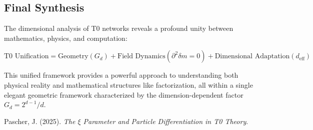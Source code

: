 \documentclass[12pt,a4paper]{article}
\newcommand{\deltafield}{\ensuremath{\delta m}}
\begin{document}
	\subsection{Final Synthesis}
	\label{subsec:final_synthesis}
	
	The dimensional analysis of T0 networks reveals a profound unity between mathematics, physics, and computation:
	
	\begin{equation}
		\boxed{\text{T0 Unification} = \text{Geometry} (G_d) + \text{Field Dynamics} (\partial^2\deltafield = 0) + \text{Dimensional Adaptation} (d_{\text{eff}})}
	\end{equation}
	
	This unified framework provides a powerful approach to understanding both physical reality and mathematical structures like factorization, all within a single elegant geometric framework characterized by the dimension-dependent factor $G_d = 2^{d-1}/d$.
	
	\begin{thebibliography}{9}
		
		Pascher, J. (2025). \textit{The $\xi$ Parameter and Particle Differentiation in T0 Theory}.
		
	\end{thebibliography}
	
\end{document}
